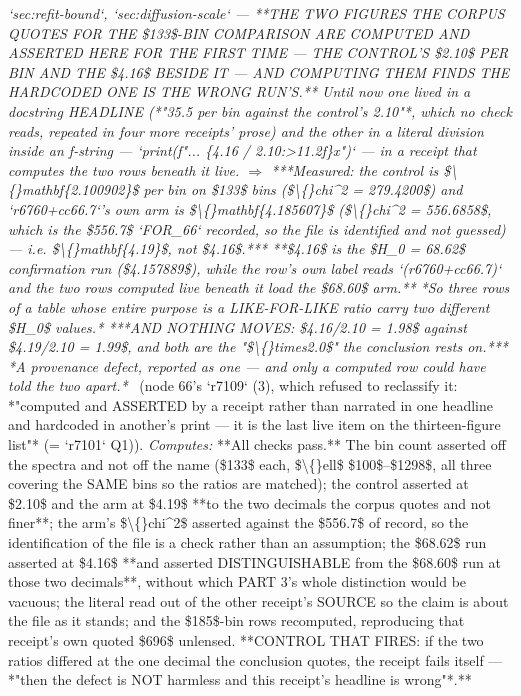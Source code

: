 \begin{description}
\textit{`sec:refit-bound`, `sec:diffusion-scale` ---  **THE TWO FIGURES THE CORPUS QUOTES FOR THE \$133\$-BIN COMPARISON ARE COMPUTED AND ASSERTED HERE FOR THE FIRST TIME --- THE CONTROL'S \$2.10\$ PER BIN AND THE \$4.16\$ BESIDE IT --- AND COMPUTING THEM FINDS THE HARDCODED ONE IS THE WRONG RUN'S.** Until now one lived in a docstring HEADLINE (*"35.5 per bin against the control's 2.10"*, which no check reads, repeated in four more receipts' prose) and the other in a literal division inside an f-string --- `print(f"... \{4.16 / 2.10:>11.2f\}x")` --- in a receipt that computes the two rows beneath it live. \ensuremath{\Rightarrow} ***Measured: the control is \$\textbackslash\{\}mathbf\{2.100902\}\$ per bin on \$133\$ bins (\$\textbackslash\{\}chi\textasciicircum{}2 = 279.4200\$) and `r6760+cc66.7`'s own arm is \$\textbackslash\{\}mathbf\{4.185607\}\$ (\$\textbackslash\{\}chi\textasciicircum{}2 = 556.6858\$, which is the \$556.7\$ `FOR\_66` recorded, so the file is identified and not guessed) --- i.e. \$\textbackslash\{\}mathbf\{4.19\}\$, not \$4.16\$.***  **\$4.16\$ is the \$H\_0 = 68.62\$ confirmation run (\$4.157889\$), while the row's own label reads `(r6760+cc66.7)` and the two rows computed live beneath it load the \$68.60\$ arm.** *So three rows of a table whose entire purpose is a LIKE-FOR-LIKE ratio carry two different \$H\_0\$ values.*  ***AND NOTHING MOVES: \$4.16/2.10 = 1.98\$ against \$4.19/2.10 = 1.99\$, and both are the "\$\textbackslash\{\}times2.0\$" the conclusion rests on.*** *A provenance defect, reported as one --- and only a computed row could have told the two apart.*} \ (node 66's `r7109` (3), which refused to reclassify it: *"computed and ASSERTED by a receipt rather than narrated in one headline and hardcoded in another's print --- it is the last live item on the thirteen-figure list"* (= `r7101` Q1)). 
\emph{Computes:} **All checks pass.** The bin count asserted off the spectra and not off the name (\$133\$ each, \$\textbackslash\{\}ell\$ \$100\$--\$1298\$, all three covering the SAME bins so the ratios are matched); the control asserted at \$2.10\$ and the arm at \$4.19\$ **to the two decimals the corpus quotes and not finer**; the arm's \$\textbackslash\{\}chi\textasciicircum{}2\$ asserted against the \$556.7\$ of record, so the identification of the file is a check rather than an assumption; the \$68.62\$ run asserted at \$4.16\$ **and asserted DISTINGUISHABLE from the \$68.60\$ run at those two decimals**, without which PART 3's whole distinction would be vacuous; the literal read out of the other receipt's SOURCE so the claim is about the file as it stands; and the \$185\$-bin rows recomputed, reproducing that receipt's own quoted \$696\$ unlensed. **CONTROL THAT FIRES: if the two ratios differed at the one decimal the conclusion quotes, the receipt fails itself --- *"then the defect is NOT harmless and this receipt's headline is wrong"*.**

\end{description}
